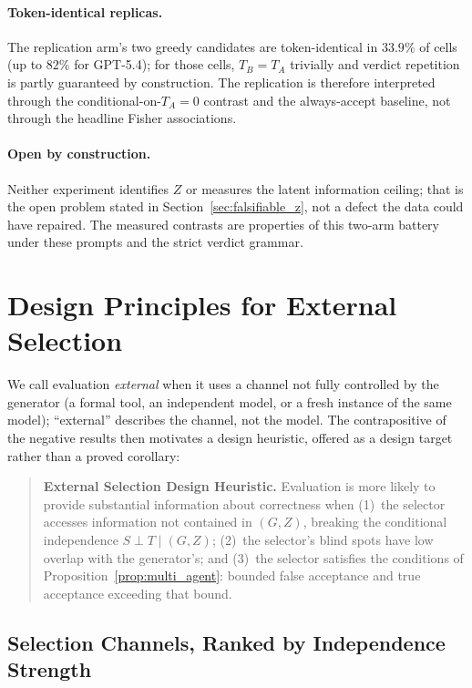 \documentclass[a4paper,journal]{IAENGtran}
\begin{document}
\paragraph{Token-identical replicas.} The replication arm's two greedy candidates are
token-identical in $33.9\%$ of cells (up to $82\%$ for GPT-5.4); for those cells,
$T_B=T_A$ trivially and verdict repetition is partly guaranteed by construction. The
replication is therefore interpreted through the conditional-on-$T_A{=}0$ contrast and
the always-accept baseline, not through the headline Fisher associations.

\paragraph{Open by construction.} Neither experiment identifies $Z$ or measures the
latent information ceiling; that is the open problem stated in
Section~\ref{sec:falsifiable_z}, not a defect the data could have repaired. The
measured contrasts are properties of this two-arm battery under these prompts and the
strict verdict grammar.

\section{Design Principles for External Selection}
\label{sec:architecture}

We call evaluation \emph{external} when it uses a channel not fully controlled by the
generator (a formal tool, an independent model, or a fresh instance of the same model);
``external'' describes the channel, not the model. The contrapositive of the negative
results then motivates a design heuristic, offered as a design target rather than a
proved corollary:

\begin{quote}
\textbf{External Selection Design Heuristic.}
Evaluation is more likely to provide substantial information about correctness when
(1)~the selector accesses information not contained in $(G,Z)$, breaking the
conditional independence $S\perp T\mid(G,Z)$; (2)~the selector's blind spots have low
overlap with the generator's; and (3)~the selector satisfies the conditions of
Proposition~\ref{prop:multi_agent}: bounded false acceptance and true acceptance
exceeding that bound.
\end{quote}

\subsection{Selection Channels, Ranked by Independence Strength}
\end{document}

